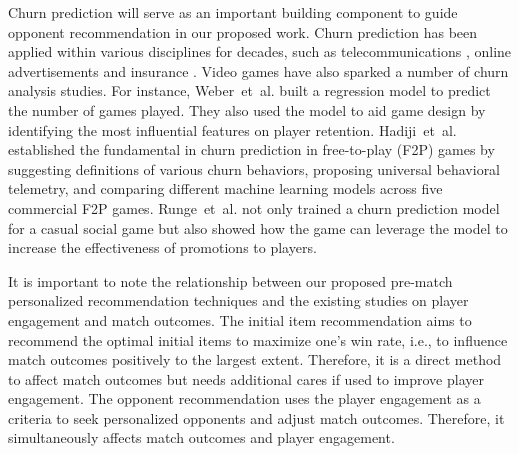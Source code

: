 Churn prediction will serve as an important building component to guide opponent recommendation in our proposed work. Churn prediction has been applied within various disciplines for decades, such as telecommunications \cite{ferreira2004data}, online advertisements \cite{yoon2010prediction} and insurance \cite{morik2004analysing}. Video games have also sparked a number of churn analysis studies. For instance, Weber~et~al. \cite{weber2011modeling} built a regression model to predict the number of games played. They also used the model to aid game design by identifying the most influential features on player retention. Hadiji~et~al. \cite{hadiji2014predicting} established the fundamental in churn prediction in free-to-play (F2P) games by suggesting definitions of various churn behaviors, proposing universal behavioral telemetry, and comparing different machine learning models across five commercial F2P games. Runge~et~al. \cite{runge2014churn} not only trained a churn prediction model for a casual social game but also showed how the game can leverage the model to increase the effectiveness of promotions to players. 

It is important to note the relationship between our proposed pre-match personalized recommendation techniques and the existing studies on player engagement and match outcomes. The initial item recommendation aims to recommend the optimal initial items to maximize one's win rate, i.e., to influence match outcomes positively to the largest extent. Therefore, it is a direct method to affect match outcomes but needs additional cares if used to improve player engagement. The opponent recommendation uses the player engagement as a criteria to seek personalized opponents and adjust match outcomes. Therefore, it simultaneously affects match outcomes and player engagement.



